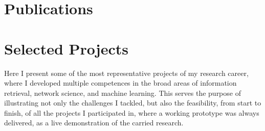 \documentclass{friggeri-cv}
\newif\ifselectedprojects
\begin{document}
\section{Publications}

\clearpage
{}


\ifselectedprojects

\section{Selected Projects}

Here I present some of the most representative projects of my research career, where I developed multiple competences in the broad areas of information retrieval, network science, and machine learning. This serves the purpose of illustrating not only the challenges I tackled, but also the feasibility, from start to finish, of all the projects I participated in, where a working prototype was always delivered, as a live demonstration of the carried research.\\
\end{document}
